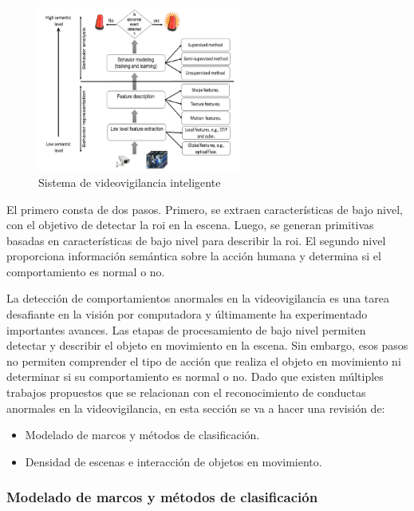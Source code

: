 \begin{figure}[ht]
\centering
\includegraphics[width=0.6\textwidth]{img/chapters/estado-del-arte/video-surveillance-system.png}
\caption{\label{fig:video-surveillance-system}Sistema de videovigilancia inteligente \cite{BENMABROUK2018480}}
\end{figure}

El primero consta de dos pasos. Primero, se extraen características de bajo nivel, con el objetivo de detectar la \gls{roi} en la escena. Luego, se generan primitivas basadas en características de bajo nivel para describir la \gls{roi}. El segundo nivel proporciona información semántica sobre la acción humana y determina si el comportamiento es normal o no.

La detección de comportamientos anormales en la videovigilancia es una tarea desafiante en la visión por computadora y últimamente ha experimentado importantes avances. Las etapas de procesamiento de bajo nivel permiten detectar y describir el objeto en movimiento en la escena. Sin embargo, esos pasos no permiten comprender el tipo de acción que realiza el objeto en movimiento ni determinar si su comportamiento es normal o no. Dado que existen múltiples trabajos propuestos que se relacionan con el reconocimiento de conductas anormales en la videovigilancia, en esta sección se va a hacer una revisión de:

\begin{itemize}
    \item Modelado de marcos y métodos de clasificación.
    \item Densidad de escenas e interacción de objetos en movimiento.
\end{itemize}

\subsubsection*{Modelado de marcos y métodos de clasificación}
\label{subsubsec:modelado-frameworks-métodos-clasificación}

